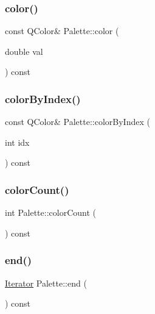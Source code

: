 \mbox{\label{class_palette_ab38596e6c853d4f35f597d1dbe834e93}} 
\subsubsection{\texorpdfstring{color()}{color()}}
{\footnotesize\ttfamily const Q\+Color\& Palette\+::color (\begin{DoxyParamCaption}\item[{double}]{val }\end{DoxyParamCaption}) const\hspace{0.3cm}{\ttfamily [inline]}}

\mbox{\label{class_palette_a8440899b32499c4c1d390bfc94d3fde1}} 
\subsubsection{\texorpdfstring{colorByIndex()}{colorByIndex()}}
{\footnotesize\ttfamily const Q\+Color\& Palette\+::color\+By\+Index (\begin{DoxyParamCaption}\item[{int}]{idx }\end{DoxyParamCaption}) const\hspace{0.3cm}{\ttfamily [inline]}}

\mbox{\label{class_palette_ad9e523affae4c20d18c5d5c869b60d52}} 
\subsubsection{\texorpdfstring{colorCount()}{colorCount()}}
{\footnotesize\ttfamily int Palette\+::color\+Count (\begin{DoxyParamCaption}{ }\end{DoxyParamCaption}) const\hspace{0.3cm}{\ttfamily [inline]}}

\mbox{\label{class_palette_aedc1961e7663b2e4a1b0494c1ead99d6}} 
\subsubsection{\texorpdfstring{end()}{end()}}
{\footnotesize\ttfamily \mbox{\hyperlink{class_palette_adbfe061d30e0b5f90145bd302003fab0}{Iterator}} Palette\+::end (\begin{DoxyParamCaption}{ }\end{DoxyParamCaption}) const\hspace{0.3cm}{\ttfamily [inline]}}

